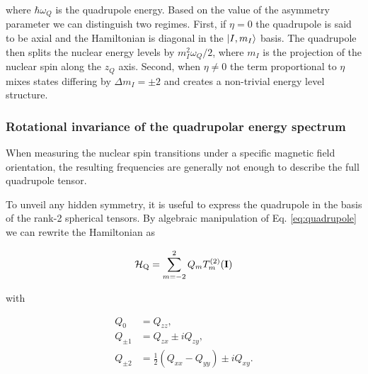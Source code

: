 where $\hbar \omega_Q$ is the quadrupole energy. Based on the value of the asymmetry parameter we can distinguish two regimes. First, if $\eta=0$ the quadrupole is said to be axial and the Hamiltonian is diagonal in the $\ket{I,m_I}$ basis. The quadrupole then splits the nuclear energy levels by $m_I^2 \omega_Q/2 $, where $m_I$ is the projection of the nuclear spin along the $z_Q$ axis. Second, when $\eta\neq0$ the term proportional to $\eta$ mixes states differing by $\Delta m_I=\pm2$ and creates a non-trivial energy level structure. 


\subsubsection{Rotational invariance of the quadrupolar energy spectrum}

When measuring the nuclear spin transitions under a specific magnetic field orientation, the resulting frequencies are generally not enough to describe the full quadrupole tensor. 

To unveil any hidden symmetry, it is useful to express the quadrupole in the basis of the rank-2 spherical tensors. By algebraic manipulation of Eq. \ref{eq:quadrupole} we can rewrite the Hamiltonian as

\begin{equation}
    \mathcal{H}_{\text{Q}} = \sum_{m = -2}^2 Q_m T^{(2)}_m(\mathbf{I})
    \label{eq:quadrupole_spherical}
\end{equation}

\noindent with

\begin{equation}
\begin{aligned}
Q_{0} &= Q_{zz}, \\
Q_{\pm 1} &= Q_{zx} \pm i Q_{zy}, \\
Q_{\pm 2} &= \tfrac{1}{2}(Q_{xx} - Q_{yy}) \pm i Q_{xy}.
\end{aligned}
\end{equation}

